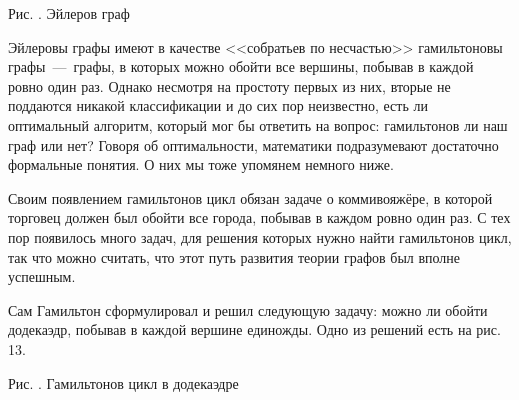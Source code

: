 \begin{center}\small Рис. \images. Эйлеров граф\end{center}	
	
	Эйлеровы графы имеют в качестве <<собратьев по несчастью>> гамильтоновы графы~---~графы, в которых можно обойти все вершины, 
	побывав в каждой ровно один раз. Однако несмотря на простоту первых из них, вторые не поддаются никакой классификации и до сих пор неизвестно, 
	есть ли оптимальный алгоритм, который мог бы ответить на вопрос: гамильтонов ли наш граф или нет? 
	Говоря об оптимальности, математики подразумевают достаточно формальные понятия. О них мы тоже упомянем немного ниже.
	
	Своим появлением гамильтонов цикл обязан задаче о коммивояжёре, в которой торговец должен был обойти все города, побывав в каждом ровно один раз. 
	С тех пор появилось много задач, для решения которых нужно найти гамильтонов цикл, так что можно считать, 
	что этот путь развития теории графов был вполне успешным.	
	
	Сам Гамильтон сформулировал и решил следующую задачу: можно ли обойти додекаэдр, побывав в каждой вершине единожды. 
	Одно из решений есть на рис. 13.
	
\begin{center}

	\small Рис. \images. Гамильтонов цикл в додекаэдре
\end{center}
	
